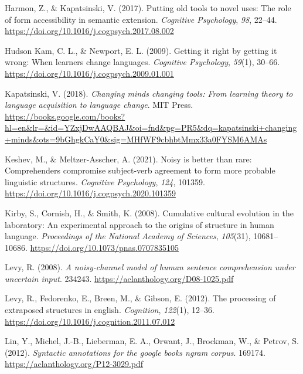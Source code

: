 \documentclass[10pt, letterpaper, hidelinks]{article}
\newenvironment{CSLReferences}%
  {}%
  {\par}
\begin{document}
\begin{CSLReferences}{1}{0}
\leavevmode{}%
Harmon, Z., \& Kapatsinski, V. (2017). Putting old tools to novel uses:
The role of form accessibility in semantic extension. \emph{Cognitive
Psychology}, \emph{98}, 22--44.
\url{https://doi.org/10.1016/j.cogpsych.2017.08.002}

\leavevmode{}%
Hudson Kam, C. L., \& Newport, E. L. (2009). Getting it right by getting
it wrong: When learners change languages. \emph{Cognitive Psychology},
\emph{59}(1), 30--66.
\url{https://doi.org/10.1016/j.cogpsych.2009.01.001}

\leavevmode{}%
Kapatsinski, V. (2018). \emph{Changing minds changing tools: From
learning theory to language acquisition to language change}. MIT Press.
\url{https://books.google.com/books?hl=en\&lr=\&id=YZxjDwAAQBAJ\&oi=fnd\&pg=PR5\&dq=kapatsinski+changing+minds\&ots=9bGhgkCaY0\&sig=MHfWF9cbhbtMmx33a0FYSM6AMAs}

\leavevmode{}%
Keshev, M., \& Meltzer-Asscher, A. (2021). Noisy is better than rare:
Comprehenders compromise subject-verb agreement to form more probable
linguistic structures. \emph{Cognitive Psychology}, \emph{124}, 101359.
\url{https://doi.org/10.1016/j.cogpsych.2020.101359}

\leavevmode{}%
Kirby, S., Cornish, H., \& Smith, K. (2008). Cumulative cultural
evolution in the laboratory: An experimental approach to the origins of
structure in human language. \emph{Proceedings of the National Academy
of Sciences}, \emph{105}(31), 10681--10686.
\url{https://doi.org/10.1073/pnas.0707835105}

\leavevmode{}%
Levy, R. (2008). \emph{A noisy-channel model of human sentence
comprehension under uncertain input}. 234243.
\url{https://aclanthology.org/D08-1025.pdf}

\leavevmode{}%
Levy, R., Fedorenko, E., Breen, M., \& Gibson, E. (2012). The processing
of extraposed structures in english. \emph{Cognition}, \emph{122}(1),
12--36. \url{https://doi.org/10.1016/j.cognition.2011.07.012}

\leavevmode{}%
Lin, Y., Michel, J.-B., Lieberman, E. A., Orwant, J., Brockman, W., \&
Petrov, S. (2012). \emph{Syntactic annotations for the google books
ngram corpus}. 169174. \url{https://aclanthology.org/P12-3029.pdf}


\end{CSLReferences}
\end{document}
